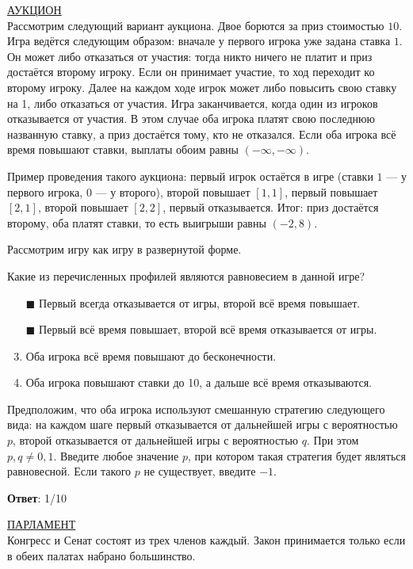 \task
\underline{АУКЦИОН} \\

Рассмотрим следующий вариант аукциона. Двое борются за приз стоимостью $10$. Игра ведётся следующим образом: вначале у первого игрока уже задана ставка $1$. Он может либо отказаться от участия: тогда никто ничего не платит и приз достаётся второму игроку. Если он принимает участие, то ход переходит ко второму игроку. Далее на каждом ходе игрок может либо повысить свою ставку на 1, либо отказаться от участия. Игра заканчивается, когда один из игроков отказывается от участия. В этом случае оба игрока платят свою последнюю названную ставку, а приз достаётся тому, кто не отказался. Если оба игрока всё время повышают ставки, выплаты обоим равны $(-\infty,-\infty)$.

Пример проведения такого аукциона: первый игрок остаётся в игре (ставки $1$ --- у первого игрока, $0$ --- у второго), второй повышает $[1,1]$, первый повышает $[2,1]$, второй повышает $[2,2]$, первый отказывается. Итог: приз достаётся второму, оба платят ставки, то есть выигрыши равны $(-2,8)$.

Рассмотрим игру как игру в развернутой форме.

Какие из перечисленных профилей являются равновесием в данной игре?

\begin{enumerate}[label=$\square$]	%
	\item[$\blacksquare$] Первый всегда отказывается от игры, второй всё время повышает.
	\item[$\blacksquare$] Первый всё время повышает, второй всё время отказывается от игры.
	\item Оба игрока всё время повышают до бесконечности.
	\item Оба игрока повышают ставки до 10, а дальше всё время отказываются.
\end{enumerate}

\task
Предположим, что оба игрока используют смешанную стратегию следующего вида: на каждом шаге первый отказывается от дальнейшей игры с вероятностью $p$, второй отказывается от дальнейшей игры с вероятностью $q$. При этом $p,q \neq 0,1$. Введите любое значение $p$, при котором такая стратегия будет являться равновесной. Если такого $p$ не существует, введите $-1$.

\textbf{Ответ}: %
1/10

\task
\underline{ПАРЛАМЕНТ} \\

Конгресс и Сенат состоят из трех членов каждый. Закон принимается только если в обеих палатах набрано большинство.


